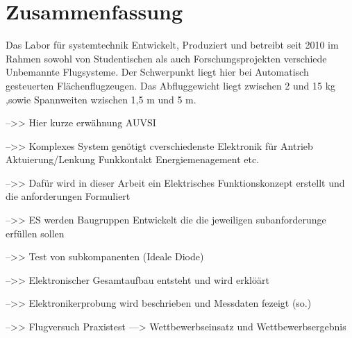 \chapter*{Zusammenfassung}

Das Labor für systemtechnik Entwickelt, Produziert und betreibt seit 2010 im Rahmen sowohl von Studentischen als auch Forschungsprojekten verschiede Unbemannte Flugsysteme.
Der Schwerpunkt liegt hier bei Automatisch gesteuerten Flächenflugzeugen.
Das Abfluggewicht liegt zwischen 2 und 15 kg ,sowie Spannweiten wzischen 1,5 m und 5 m.

-->> Hier kurze erwähnung AUVSI 

-->> Komplexes System genötigt cverschiedenste Elektronik für Antrieb Aktuierung/Lenkung Funkkontakt Energiemenagement etc.

-->> Dafür wird in dieser Arbeit ein Elektrisches Funktionskonzept erstellt und die anforderungen Formuliert

-->> ES werden Baugruppen Entwickelt die die jeweiligen subanforderunge erfüllen sollen

-->> Test von subkompanenten (Ideale Diode)

-->> Elektronischer Gesamtaufbau entsteht und wird erklöärt

-->> Elektronikerprobung wird beschrieben und Messdaten fezeigt (so.)

-->> Flugversuch Praxistest ---> Wettbewerbseinsatz und Wettbewerbsergebnis

